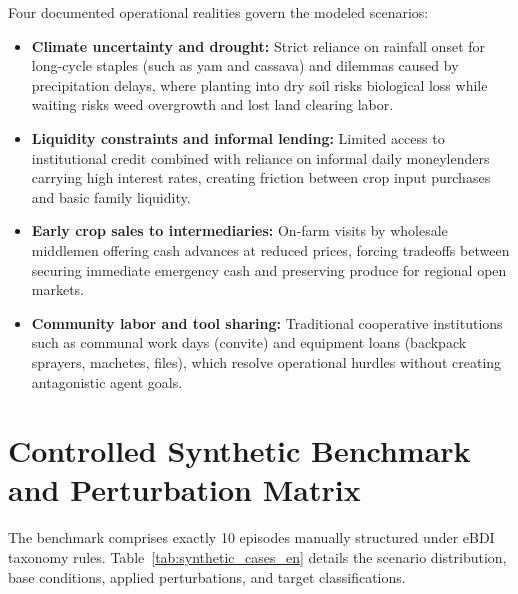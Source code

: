 \documentclass[11pt,a4paper]{article}
\begin{document}
Four documented operational realities govern the modeled scenarios:
\begin{itemize}[itemsep=2pt]
    \item \textbf{Climate uncertainty and drought:} Strict reliance on rainfall onset for long-cycle staples (such as yam and cassava) and dilemmas caused by precipitation delays, where planting into dry soil risks biological loss while waiting risks weed overgrowth and lost land clearing labor.
    \item \textbf{Liquidity constraints and informal lending:} Limited access to institutional credit combined with reliance on informal daily moneylenders carrying high interest rates, creating friction between crop input purchases and basic family liquidity.
    \item \textbf{Early crop sales to intermediaries:} On-farm visits by wholesale middlemen offering cash advances at reduced prices, forcing tradeoffs between securing immediate emergency cash and preserving produce for regional open markets.
    \item \textbf{Community labor and tool sharing:} Traditional cooperative institutions such as communal work days (convite) and equipment loans (backpack sprayers, machetes, files), which resolve operational hurdles without creating antagonistic agent goals.
\end{itemize}

\section{Controlled Synthetic Benchmark and Perturbation Matrix}

The benchmark comprises exactly 10 episodes manually structured under eBDI taxonomy rules. Table~\ref{tab:synthetic_cases_en} details the scenario distribution, base conditions, applied perturbations, and target classifications.
\end{document}
